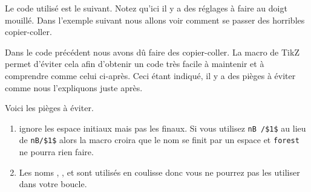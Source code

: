 \documentclass[12pt,a4paper]{article}
\begin{document}
Le code utilisé est le suivant.
Notez qu'ici il y a des réglages à faire au doigt mouillé.
Dans l'exemple suivant nous allons voir comment se passer des horribles copier-coller.






Dans le code précédent nous avons dû faire des copier-coller. La macro  de TikZ permet d'éviter cela afin d'obtenir un code très facile à maintenir et à comprendre comme celui ci-après. Ceci étant indiqué, il y a des pièges à éviter comme nous l'expliquons juste après.

%


Voici les pièges à éviter.

\begin{enumerate}
	\item {} ignore les espace initiaux mais pas les finaux. Si vous utilisez \verb#nB /$1$# au lieu de  \verb#nB/$1$# alors la macro croira que le nom se finit par un espace et \verb#forest# ne pourra rien faire. 

	\item Les noms , ,  et  sont utilisés en coulisse donc vous ne pourrez pas les utiliser dans votre boucle.
\end{enumerate}
\end{document}
